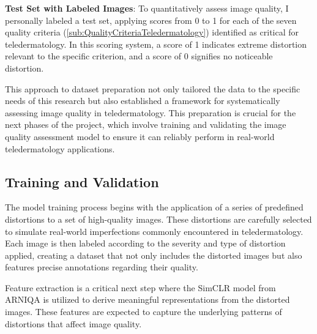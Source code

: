 \textbf{Test Set with Labeled Images}: To quantitatively assess image quality, I personally labeled a test set, applying scores from 0 to 1 for each of the seven quality criteria (\autoref{sub:QualityCriteriaTeledermatology}) identified as critical for teledermatology. In this scoring system, a score of 1 indicates extreme distortion relevant to the specific criterion, and a score of 0 signifies no noticeable distortion.
\par
\vspace{\baselineskip}
\noindent
This approach to dataset preparation not only tailored the data to the specific needs of this research but also established a framework for systematically assessing image quality in teledermatology. This preparation is crucial for the next phases of the project, which involve training and validating the image quality assessment model to ensure it can reliably perform in real-world teledermatology applications. \par


\subsection{Training and Validation}
\label{sub:TrainVal}
The model training process begins with the application of a series of predefined distortions to a set of high-quality images. These distortions are carefully selected to simulate real-world imperfections commonly encountered in teledermatology. Each image is then labeled according to the severity and type of distortion applied, creating a dataset that not only includes the distorted images but also features precise annotations regarding their quality.
\par
\vspace{\baselineskip}
\noindent
Feature extraction is a critical next step where the SimCLR model from ARNIQA is utilized to derive meaningful representations from the distorted images. These features are expected to capture the underlying patterns of distortions that affect image quality. \par


